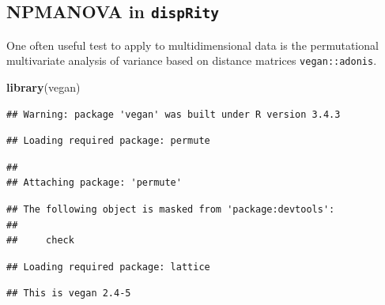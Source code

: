 \documentclass[]{book}
\newenvironment{Shaded}{\begin{snugshade}}{\end{snugshade}}
\newcommand{\KeywordTok}[1]{\textcolor[rgb]{0.13,0.29,0.53}{\textbf{#1}}}
\newcommand{\NormalTok}[1]{#1}
\theoremstyle{definition}
\theoremstyle{definition}
\theoremstyle{remark}
\begin{document}
\subsection{\texorpdfstring{NPMANOVA in
\texttt{dispRity}}{NPMANOVA in dispRity}}\label{npmanova-in-disprity}

One often useful test to apply to multidimensional data is the
permutational multivariate analysis of variance based on distance
matrices \texttt{vegan::adonis}.

\begin{Shaded}
\begin{Highlighting}[]
\KeywordTok{library}\NormalTok{(vegan)}
\end{Highlighting}
\end{Shaded}

\begin{verbatim}
## Warning: package 'vegan' was built under R version 3.4.3
\end{verbatim}

\begin{verbatim}
## Loading required package: permute
\end{verbatim}

\begin{verbatim}
## 
## Attaching package: 'permute'
\end{verbatim}

\begin{verbatim}
## The following object is masked from 'package:devtools':
## 
##     check
\end{verbatim}

\begin{verbatim}
## Loading required package: lattice
\end{verbatim}

\begin{verbatim}
## This is vegan 2.4-5
\end{verbatim}
\end{document}
